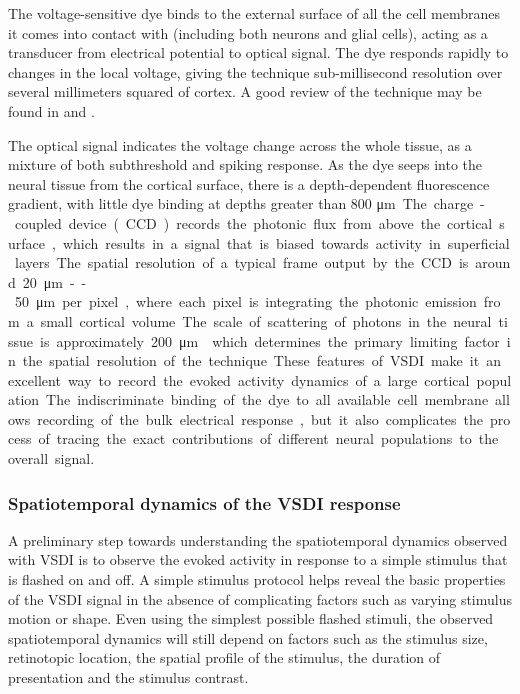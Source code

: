 \documentclass[phd,ianc,twoside]{infthesis}
\begin{document}
The voltage-sensitive dye binds to the external surface of all the cell
membranes it comes into contact with (including both neurons and glial
cells), acting as a transducer from
electrical potential to optical signal. The dye responds rapidly to
changes in the local voltage, giving the technique sub-millisecond
resolution over several millimeters squared of cortex. A good
review of the technique may be found in 
\citet{grinvald_natneuro05} and \citet{chemla_jphys10}.

The optical signal indicates the voltage
change across the whole tissue, as a mixture of both subthreshold and spiking
response. As the dye seeps into the neural tissue from the cortical
surface, there is a depth-dependent fluorescence gradient, with little dye
binding at depths greater than 800 \si\micro m.  The charge-coupled
device (CCD) records the photonic flux from above the cortical surface,
which results in a signal that is biased towards activity in superficial
layers.

The spatial resolution of a typical frame output by the CCD is around
20\si\micro m -- 50\si\micro m per pixel, where each pixel is integrating
the photonic emission from a small cortical volume. The scale of
scattering of photons in the neural tissue is approximately 200
\si\micro m \citep{orbach_jn83} which determines the primary limiting
factor in the spatial resolution of the technique.

These features of VSDI make it an excellent way to record the evoked
activity dynamics of a large cortical population. The indiscriminate
binding of the dye to all available cell membrane allows recording of
the bulk electrical response, but it also complicates the process of tracing
the exact contributions of different neural populations to the overall
signal.


\subsubsection*{Spatiotemporal dynamics of the VSDI response}
\label{section:VSDI_dynamics_background}

A preliminary step towards understanding the spatiotemporal dynamics
observed with VSDI is to observe the evoked activity in response to a
simple stimulus that is flashed on and off. A simple stimulus protocol
helps reveal the basic properties of the VSDI signal in the absence of
complicating factors such as varying stimulus motion or shape. Even
using the simplest possible flashed stimuli, the observed spatiotemporal
dynamics will still depend on factors such as the stimulus size,
retinotopic location, the spatial profile of the stimulus, the duration of
presentation and the stimulus contrast.
\end{document}
